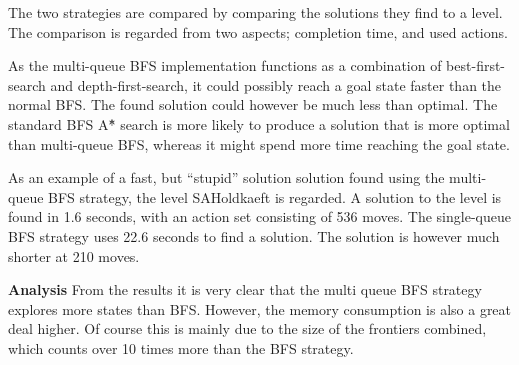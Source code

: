 \documentclass[Main]{subfiles}
\begin{document}
The two strategies are compared by comparing the solutions they find to a level. The comparison is regarded from two aspects; completion time, and used actions. 



As the multi-queue BFS implementation functions as a combination of best-first-search and depth-first-search, it could possibly reach a goal state faster than the normal BFS. The found solution could however be much less than optimal. The standard BFS A\^{*} search is more likely to produce a solution that is more optimal than multi-queue BFS, whereas it might spend more time reaching the goal state. 



As an example of a fast, but ``stupid'' solution solution found using the multi-queue BFS strategy, the level SAHoldkaeft is regarded. A solution to the level is found in 1.6 seconds, with an action set consisting of 536 moves. 
The single-queue BFS strategy uses 22.6 seconds to find a solution. The solution is however much shorter at 210 moves. 















\textbf{Analysis}
From the results it is very clear that the multi queue BFS strategy explores more states than BFS. However, the memory consumption is also a great deal higher. Of course this is mainly due to the size of the frontiers combined, which counts over 10 times more than the BFS strategy. 








\end{document}
